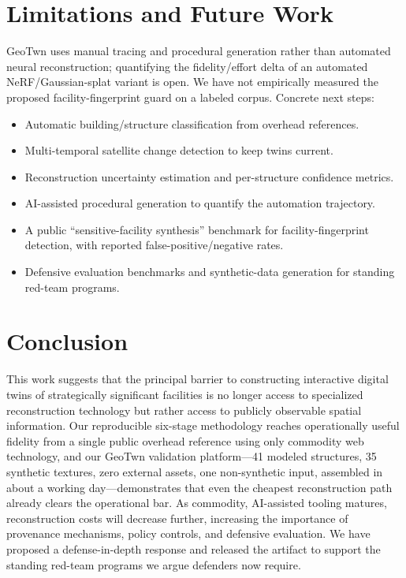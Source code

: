 \documentclass[conference]{IEEEtran}
\begin{document}
\section{Limitations and Future Work}
\label{sec:future}
GeoTwn uses manual tracing and procedural generation rather than automated neural
reconstruction; quantifying the fidelity/effort delta of an automated
NeRF/Gaussian-splat variant is open. We have not empirically measured the proposed
facility-fingerprint guard on a labeled corpus. Concrete next steps:
\begin{itemize}
\item Automatic building/structure classification from overhead references.
\item Multi-temporal satellite change detection to keep twins current.
\item Reconstruction uncertainty estimation and per-structure confidence metrics.
\item AI-assisted procedural generation to quantify the automation trajectory.
\item A public ``sensitive-facility synthesis'' benchmark for facility-fingerprint
detection, with reported false-positive/negative rates.
\item Defensive evaluation benchmarks and synthetic-data generation for standing
red-team programs.
\end{itemize}

\section{Conclusion}
This work suggests that the principal barrier to constructing interactive digital
twins of strategically significant facilities is no longer access to specialized
reconstruction technology but rather access to publicly observable spatial
information. Our reproducible six-stage methodology reaches operationally useful
fidelity from a single public overhead reference using only commodity web
technology, and our GeoTwn validation platform---41 modeled structures, 35 synthetic
textures, zero external assets, one non-synthetic input, assembled in about a
working day---demonstrates that even the cheapest reconstruction path already
clears the operational bar. As commodity, AI-assisted tooling matures,
reconstruction costs will decrease further, increasing the importance of
provenance mechanisms, policy controls, and defensive evaluation. We have proposed
a defense-in-depth response and released the artifact to support the standing
red-team programs we argue defenders now require.
\end{document}
